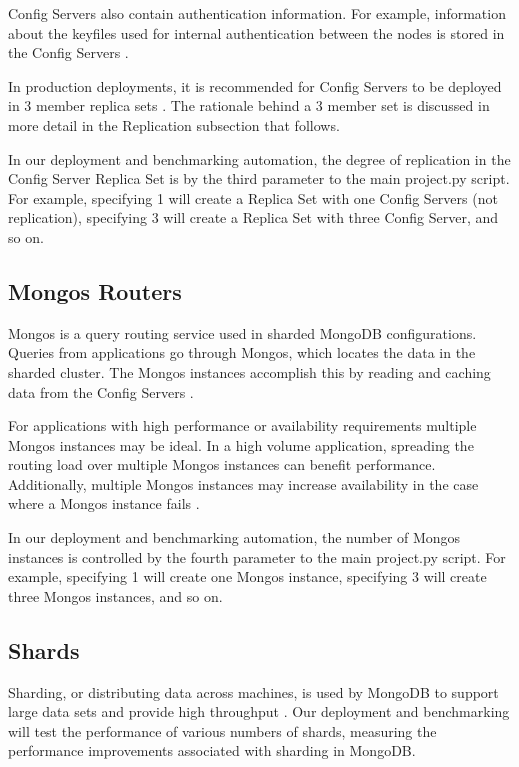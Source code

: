 \documentclass[9pt,twocolumn,twoside]{../../styles/osajnl}
\begin{document}
Config Servers also contain authentication information.  For example, information about the keyfiles used for internal authentication between the nodes is stored in the Config Servers \cite{www-mongoConfig}.

In production deployments, it is recommended for Config Servers to be deployed in 3 member replica sets \cite{www-mongoComponents}.  The rationale behind a 3 member set is discussed in more detail in the Replication subsection that follows.

In our deployment and benchmarking automation, the degree of replication in the Config Server Replica Set is by the third parameter to the main project.py script.  For example, specifying 1 will create a Replica Set with one Config Servers (not replication), specifying 3 will create a Replica Set with three Config Server, and so on. 

\subsection{Mongos Routers}

Mongos is a query routing service used in sharded MongoDB configurations.  Queries from applications go through Mongos, which locates the data in the sharded cluster. The Mongos instances accomplish this by reading and caching data from the Config Servers \cite{www-mongoMongos}. 

For applications with high performance or availability requirements multiple Mongos instances may be ideal.  In a high volume application, spreading the routing load over multiple Mongos instances can benefit performance.  Additionally, multiple Mongos instances may increase availability in the case where a Mongos instance fails \cite{www-mongoConfig}.

In our deployment and benchmarking automation, the number of Mongos instances is controlled by the fourth parameter to the main project.py script.  For example, specifying 1 will create one Mongos instance, specifying 3 will create three Mongos instances, and so on. 


\subsection{Shards}

Sharding, or distributing data across machines, is used by MongoDB to support large data sets and provide high throughput \cite{www-sharding}.  Our deployment and benchmarking will test the performance of various numbers of shards, measuring the performance improvements associated with sharding in MongoDB.
\end{document}
